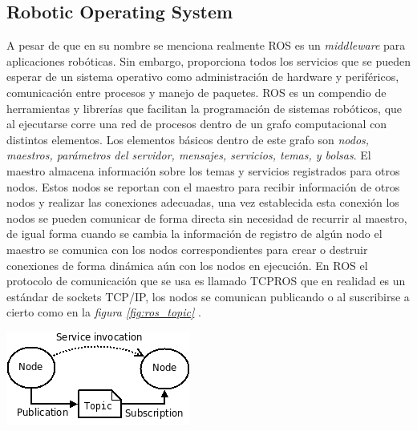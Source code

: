 \subsection{Robotic Operating System}
A pesar de que en su nombre se menciona  realmente ROS es un \emph{middleware} para aplicaciones robóticas. Sin embargo, proporciona todos los servicios que se pueden esperar de un sistema operativo como administración de hardware y periféricos, comunicación entre procesos y manejo de paquetes. ROS es un compendio de herramientas y librerías que facilitan la programación de sistemas robóticos, que al ejecutarse corre una red de procesos  dentro de un grafo computacional con distintos elementos. Los elementos básicos dentro de este grafo son \emph{nodos, maestros, parámetros del servidor, mensajes, servicios, temas, y bolsas}. El maestro almacena información sobre los temas y servicios registrados para otros nodos. Estos nodos se reportan con el maestro para recibir información de otros nodos y realizar las conexiones adecuadas, una vez establecida esta conexión los nodos se pueden comunicar de forma directa sin necesidad de recurrir al maestro, de igual forma cuando se cambia la información de registro de algún nodo el maestro se comunica con los nodos correspondientes para crear o destruir conexiones de forma dinámica aún con los nodos en ejecución. En ROS el protocolo de comunicación que se usa es llamado TCPROS que en realidad es un estándar de sockets TCP/IP, los nodos se comunican publicando o al suscribirse a cierto  como en la \emph{figura \ref{fig:ros_topic}} \cite{Referencia6}.
\begin{center}
    \includegraphics[scale=0.7]{imagenes/ros_topic.png}
    \label{fig:ros_topic}
\end{center}
